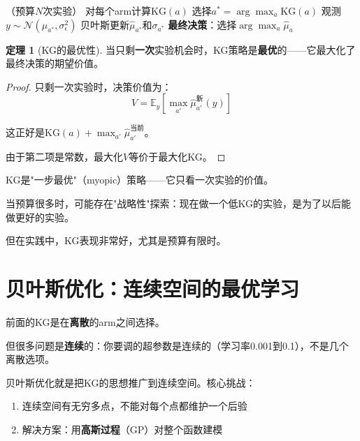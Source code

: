\documentclass[11pt,a4paper]{article}
\theoremstyle{definition}
\newtheorem{theorem}{定理}[section]
\begin{document}
\begin{algorithm}[H]
\caption{Knowledge Gradient算法}
\begin{algorithmic}[1]
（预算$N$次实验）
    \State 对每个arm计算$\text{KG}(a)$
    \State 选择$a^* = \arg\max_a \text{KG}(a)$
    \State 观测$y \sim \mathcal{N}(\mu_{a^*}, \sigma_\epsilon^2)$
    \State 贝叶斯更新$\hat{\mu}_{a^*}$和$\sigma_{a^*}$
\EndFor
\State \textbf{最终决策}：选择$\arg\max_a \hat{\mu}_a$
\end{algorithmic}
\end{algorithm}

\begin{theorem}[KG的最优性]
当只剩\textbf{一次}实验机会时，KG策略是\textbf{最优}的——它最大化了最终决策的期望价值。
\end{theorem}

\begin{proof}
只剩一次实验时，决策价值为：
\[
V = \mathbb{E}_y[\max_{a'} \hat{\mu}_{a'}^{\text{新}}(y)]
\]

这正好是$\text{KG}(a) + \max_{a'}\hat{\mu}_{a'}^{\text{当前}}$。

由于第二项是常数，最大化$V$等价于最大化KG。
\end{proof}

\begin{plainwords}[KG的局限]
KG是"一步最优"（myopic）策略——它只看一次实验的价值。

当预算很多时，可能存在"战略性"探索：现在做一个低KG的实验，是为了以后能做更好的实验。

但在实践中，KG表现非常好，尤其是预算有限时。
\end{plainwords}

\section{贝叶斯优化：连续空间的最优学习}

\begin{plainwords}[从离散到连续]
前面的KG是在\textbf{离散}的arm之间选择。

但很多问题是\textbf{连续}的：你要调的超参数是连续的（学习率0.001到0.1），不是几个离散选项。

贝叶斯优化就是把KG的思想推广到连续空间。核心挑战：

\begin{enumerate}
    \item 连续空间有无穷多点，不能对每个点都维护一个后验
    \item 解决方案：用\textbf{高斯过程}（GP）对整个函数建模
\end{enumerate}
\end{plainwords}
\end{document}
